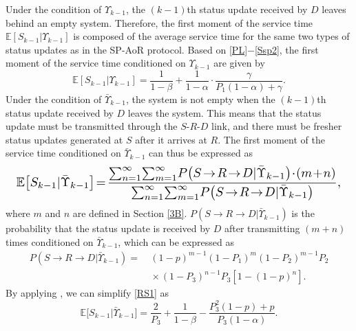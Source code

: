 \documentclass{IEEEtran}
\begin{document}
Under the condition of $\Upsilon_{k-1}$, the $(k-1)$th status update received by $D$ leaves behind an empty system. Therefore, the first moment of the service time $\mathbb{E}[S_{k-1}|\Upsilon_{k-1}]$ is composed of the average service time for the same two types of status updates as in the SP-AoR protocol. Based on \eqref{PL}$-$\eqref{Ssp2}, the first moment of the service time conditioned on $\Upsilon_{k-1}$ are given by
\begin{equation}\label{S1}
\mathbb{E}[S_{k-1}|\Upsilon_{k-1}]=\frac{1}{1-\beta}+\frac{1}{1-\alpha}\cdot\frac{\gamma}{P_{1}(1-\alpha)+\gamma}.
\end{equation}
Under the condition of $\bar{\Upsilon}_{k-1}$, the system is not empty when the $(k-1)$th status update received by $D$ leaves the system. This means that the status update must be transmitted through the $S$-$R$-$D$ link, and there must be fresher status updates generated at $S$ after it arrives at $R$. The first moment of the service time conditioned on $\bar{\Upsilon}_{k-1}$ can thus be expressed as
\begin{equation}\label{RS1}
	\resizebox{.98\hsize}{!}{$\begin{aligned}
\mathbb{E}\big[S_{k-1}|
\bar{\Upsilon}_{k-1}\big]\!=\!\frac{\sum_{n=1}^{\infty}\!\sum_{m=1}^{\infty}\!P\!\left(S\!\rightarrow\! R\!\rightarrow\! D|\bar{\Upsilon}_{k-1}\right)\!\cdot\! (m\!+\!n)}{\sum_{n=1}^{\infty}\!\sum_{m=1}^{\infty}\!P\!\left(S\!\rightarrow\! R\!\rightarrow\! D|\bar{\Upsilon}_{k-1}\right)},
\end{aligned}$}
\end{equation}
where $m$ and $n$ are defined in Section \ref{3B}. $P\left(S\rightarrow R\rightarrow D|\bar{\Upsilon}_{k-1}\right)$ is the probability that the status update is received by $D$ after transmitting $(m+n)$ times conditioned on $\bar{\Upsilon}_{k-1}$, which can be expressed as
\begin{equation}
\begin{aligned}
P\!\left(S\!\rightarrow \!R\!\rightarrow\! D|\bar{\Upsilon}_{k-1}\right)\!=\!\ &(1\!-\!p)^{m-1}(1\!-\!P_1)^m(1\!-\!P_2)^{m-1}P_2\\
&\!\times(1\!-\!P_3)^{n-1}P_3\left[1\!-\!(1\!-\!p)^n\right].
\end{aligned}
\end{equation}
By applying \cite[Eqs. (0.112) and (0.113)]{b7}, we can simplify \eqref{RS1} as
\begin{equation}\label{S2}
\mathbb{E}\big[S_{k-1}|\bar{\Upsilon}_{k-1}\big]=\frac{2}{P_3}+\frac{1}{1-\beta}-\frac{P_3^2(1-p)+p}{P_3(1-\alpha)}.
\end{equation}
\end{document}
